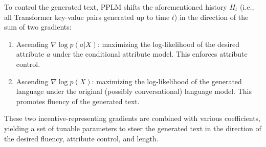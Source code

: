 
To control the generated text, PPLM shifts the aforementioned history $H_t$ (i.e., all Transformer key-value pairs generated up to time $t$) in the direction of the sum of two gradients:

\begin{enumerate}
    \item Ascending $\nabla \log p(a | X)$: maximizing the log-likelihood of the desired attribute $a$ under the conditional attribute model. This enforces attribute control.
    \item Ascending $\nabla \log p(X)$: maximizing the log-likelihood of the generated language under the original (possibly conversational) language model. This promotes fluency of the generated text.
\end{enumerate}

These two incentive-representing gradients are combined with various coefficients, yielding a set of tunable parameters to steer the generated text in the direction of the desired fluency, attribute control, and length.

